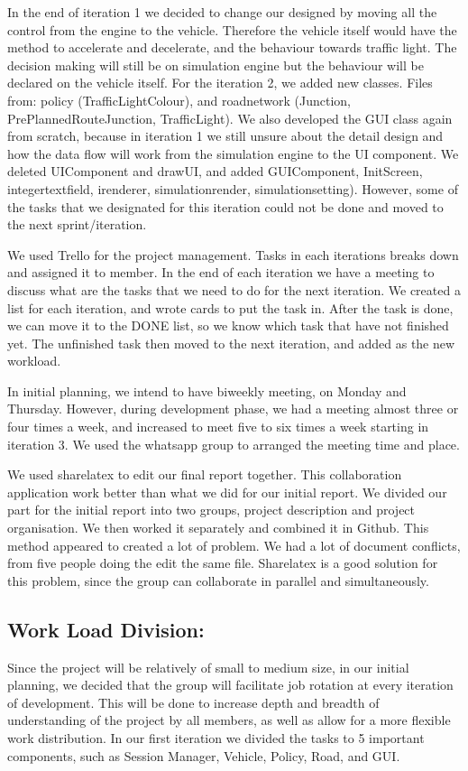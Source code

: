 \documentclass[11pt]{article}
\begin{document}
{In the end of iteration 1 we decided to change our designed by moving all the control from the engine to the vehicle. Therefore the vehicle itself would have the method to accelerate and decelerate, and the behaviour towards traffic light. The decision making will still be on simulation engine but the behaviour will be declared on the vehicle itself. 
For the iteration 2, we added new classes. Files from: policy (TrafficLightColour), and roadnetwork (Junction, PrePlannedRouteJunction, TrafficLight). We also developed the GUI class again from scratch, because in iteration 1 we still unsure about the detail design and how the data flow will work from the simulation engine to the UI component. We deleted UIComponent and drawUI, and added GUIComponent, InitScreen, integertextfield, irenderer, simulationrender, simulationsetting). However, some of the tasks that we designated for this iteration could not be done and moved to the next sprint/iteration.  

We used Trello for the project management. Tasks in each iterations breaks down and assigned it to member. In the end of each iteration we have a meeting to discuss what are the tasks that we need to do for the next iteration. We created a list for each iteration, and wrote cards to put the task in. After the task is done, we can move it to the DONE list, so we know which task that have not finished yet. The unfinished task then moved to the next iteration, and added as the new workload.

In initial planning, we intend to have biweekly meeting, on Monday and Thursday. However, during development phase, we had a meeting almost three or four times a week, and increased to meet five to six times a week starting in iteration 3. We used the whatsapp group to arranged the meeting time and place. 

We used sharelatex to edit our final report together. This collaboration application work better than what we did for our initial report. We divided our part for the initial report into two groups, project description and project organisation. We then worked it separately and combined it in Github. This method appeared to created a lot of problem. We had a lot of document conflicts, from five people doing the edit the same file. Sharelatex is a good solution for this problem, since the group can collaborate in parallel and simultaneously. 

\subsection{Work Load Division:}
Since the project will be relatively of small to medium size, in our initial planning, we decided that the group will facilitate job rotation at every iteration of development. This will be done to increase depth and breadth of understanding of the project by all members, as well as allow for a more flexible work distribution. In our first iteration we divided the tasks to 5 important components, such as Session Manager, Vehicle, Policy, Road, and GUI.

}
\end{document}
